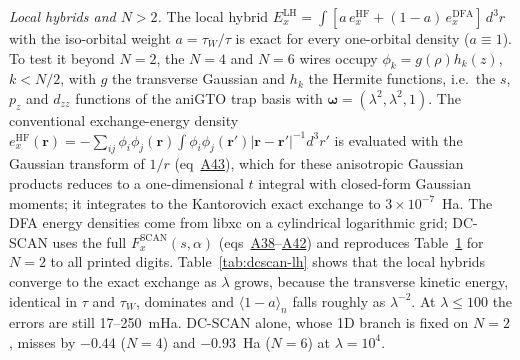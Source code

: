 \documentclass[journal=jctcce,manuscript=suppinfo]{achemso}
\begin{document}
\emph{Local hybrids and $N>2$.}  The local hybrid
$E_x^{\mathrm{LH}}=\int[a\,e_x^{\mathrm{HF}}+(1-a)\,e_x^{\mathrm{DFA}}]\,d^3r$
with the iso-orbital weight $a=\tau_W/\tau$\cite{jaramillo2003local} is exact
for every one-orbital density ($a\equiv1$).  To test it beyond $N=2$, the
$N=4$ and $N=6$ wires occupy $\phi_k=g(\rho)h_k(z)$, $k<N/2$, with $g$ the
transverse Gaussian and $h_k$ the Hermite functions, i.e.\ the $s$, $p_z$ and
$d_{zz}$ functions of the aniGTO trap basis with
$\boldsymbol\omega=(\lambda^2,\lambda^2,1)$.  The conventional exchange-energy
density $e_x^{\mathrm{HF}}(\mathbf r)=-\sum_{ij}\phi_i\phi_j(\mathbf r)
\int\phi_i\phi_j(\mathbf r')|\mathbf r-\mathbf r'|^{-1}d^3r'$ is evaluated with
the Gaussian transform of $1/r$ (eq~\href{main.pdf\#equation.43}{A43}), which for these
anisotropic Gaussian products reduces to a one-dimensional $t$ integral with
closed-form Gaussian moments; it integrates to the Kantorovich exact exchange
to $3\times10^{-7}$~Ha.  The DFA energy densities come from libxc on a
cylindrical logarithmic grid; DC-SCAN uses the full
$F_x^{\mathrm{SCAN}}(s,\alpha)$ (eqs~\href{main.pdf\#equation.38}{A38}--\href{main.pdf\#equation.42}{A42})
and reproduces Table~\href{main.pdf\#table.1}{1} for $N=2$ to all printed digits.
Table~\ref{tab:dcscan-lh} shows that the local hybrids converge to the exact
exchange as $\lambda$ grows, because the transverse kinetic energy, identical
in $\tau$ and $\tau_W$, dominates and $\langle1-a\rangle_n$ falls roughly as
$\lambda^{-2}$.  At $\lambda\le100$ the errors are still 17--250~mHa.
DC-SCAN alone, whose 1D branch is fixed on $N=2$, misses by $-0.44$ ($N=4$)
and $-0.93$~Ha ($N=6$) at $\lambda=10^4$.
\end{document}
